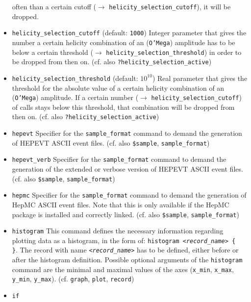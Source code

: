 \documentclass[12pt]{book}
\newcommand{\ttt}[1]{\texttt{#1}}
\newcommand{\oMega}{\texttt{O'Mega}}
\begin{document}
\begin{itemize}
often than a certain cutoff ($\to$ \ttt{helicity\_selection\_cutoff}),
it will be dropped. 
\item
\ttt{helicity\_selection\_cutoff} \qquad (default: \ttt{1000})  \newline
Integer parameter that gives the number a certain helicity combination
of an (\oMega) amplitude has to be below a certain threshold ($\to$
\ttt{helicity\_selection\_threshold}) in order to be dropped from then
on. (cf. also \ttt{?helicity\_selection\_active})
\item
\ttt{helicity\_selection\_threshold} \qquad (default: $10^{10}$)
\newline 
Real parameter that gives the threshold for the absolute value of a
certain helicity combination of an (\oMega) amplitude. If a certain
number ($\to$ \ttt{helicity\_selection\_cutoff}) of calls stays below
this threshold, that combination will be dropped from then
on. (cf. also \ttt{?helicity\_selection\_active})
\item
\ttt{hepevt} \newline 
Specifier for the \ttt{sample\_format} command to demand the
generation of HEPEVT ASCII event files. (cf. also \ttt{\$sample},
\ttt{sample\_format}) 
\item
\ttt{hepevt\_verb} \newline 
Specifier for the \ttt{sample\_format} command to demand the
generation of the extended or verbose version of HEPEVT ASCII event
files. (cf. also \ttt{\$sample}, \ttt{sample\_format}) 
\item
\ttt{hepmc} \newline 
Specifier for the \ttt{sample\_format} command to demand the
generation of HepMC ASCII event files. Note that this is only
available if the HepMC package is installed and correctly
linked. (cf. also \ttt{\$sample}, \ttt{sample\_format}) 
\item
\ttt{histogram} \newline
This command defines the necessary information regarding plotting data
as a histogram, in the form of: \ttt{histogram {\em <record\_name>} \{
{\em <optional arguments>} \}}. The record with name \ttt{{\em <record\_name>}} has to be
defined, either before or after the histogram definition. Possible optional
arguments of the \ttt{histogram} command are the minimal and maximal values
of the axes (\ttt{x\_min}, \ttt{x\_max}, \ttt{y\_min}, \ttt{y\_max}). 
(cf. \ttt{graph}, \ttt{plot}, \ttt{record})
\item
\ttt{if} \newline

\end{itemize}
\end{document}
